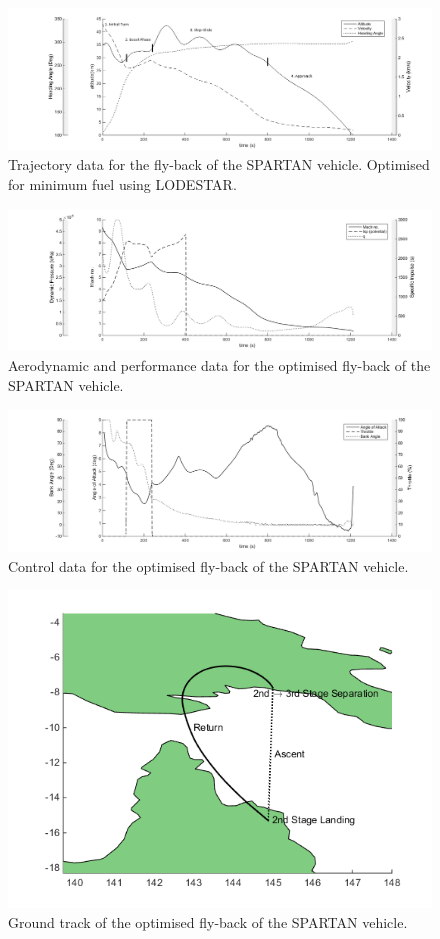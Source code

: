 \documentclass[conf]{new-aiaa}
\begin{document}
\begin{figure}
	\centering
	\includegraphics[width=0.9\linewidth]{Figures/Traj1}
	\caption{Trajectory data for the fly-back of the SPARTAN vehicle. Optimised for minimum fuel using LODESTAR.}
	\label{fig:Traj1}
\end{figure}
\begin{figure}
	\centering
	\includegraphics[width=0.9\linewidth]{Figures/Traj2}
	\caption{Aerodynamic and performance data for the optimised fly-back of the SPARTAN vehicle.}
	\label{fig:Traj2}
\end{figure}
\begin{figure}
	\centering
	\includegraphics[width=0.9\linewidth]{Figures/Traj3}
	\caption{Control data for the optimised fly-back of the SPARTAN vehicle.}
	\label{fig:Traj3}
\end{figure}

\begin{figure}
	\centering
	\includegraphics[width=0.5\linewidth]{Figures/lon-lat}
	\caption{Ground track of the optimised fly-back of the SPARTAN vehicle.}
	\label{fig:lon-lat}
\end{figure}
\end{document}
